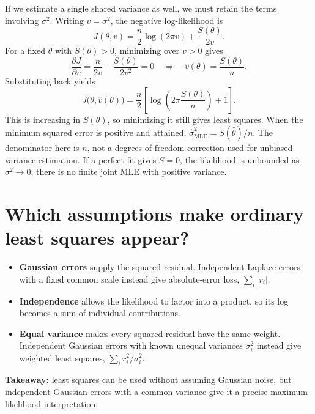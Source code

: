 \documentclass[11pt,a4paper]{article}
\begin{document}
If we estimate a single shared variance as well, we must retain the terms
involving $\sigma^2$. Writing $v=\sigma^2$, the negative log-likelihood is
\[
    J(\theta,v)=\frac{n}{2}\log(2\pi v)+\frac{S(\theta)}{2v}.
\]
For a fixed $\theta$ with $S(\theta)>0$, minimizing over $v>0$ gives
\[
    \frac{\partial J}{\partial v}
    =\frac{n}{2v}-\frac{S(\theta)}{2v^2}=0
    \quad\Longrightarrow\quad
    \widehat v(\theta)=\frac{S(\theta)}{n}.
\]
Substituting back yields
\[
    J\bigl(\theta,\widehat v(\theta)\bigr)
    =\frac{n}{2}\left[\log\!\left(2\pi\frac{S(\theta)}{n}\right)+1\right].
\]
This is increasing in $S(\theta)$, so minimizing it still gives least squares.
When the minimum squared error is positive and attained,
$\widehat\sigma^2_{\mathrm{MLE}}=S(\widehat\theta)/n$.
The denominator here is $n$, not a degrees-of-freedom correction used for
unbiased variance estimation. If a perfect fit gives $S=0$, the likelihood is
unbounded as $\sigma^2\to0$; there is no finite joint MLE with positive variance.

\section{Which assumptions make ordinary least squares appear?}

\begin{itemize}
    \item \textbf{Gaussian errors} supply the squared residual. Independent
    Laplace errors with a fixed common scale instead give absolute-error loss,
    $\sum_i |r_i|$.
    \item \textbf{Independence} allows the likelihood to factor into a product,
    so its log becomes a sum of individual contributions.
    \item \textbf{Equal variance} makes every squared residual have the same
    weight. Independent Gaussian errors with known unequal variances
    $\sigma_i^2$ instead give weighted least squares,
    $\sum_i r_i^2/\sigma_i^2$.
\end{itemize}

\textbf{Takeaway:} least squares can be used without assuming Gaussian noise,
but independent Gaussian errors with a common variance give it a precise
maximum-likelihood interpretation.
\end{document}
